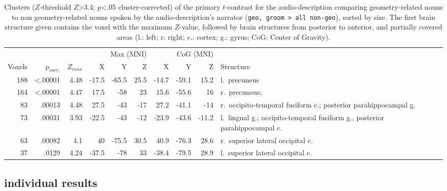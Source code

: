 \documentclass[english]{article}
\begin{document}
\begin{table*}[tbp]
\caption{Clusters ($Z$-threshold $Z$>3.4; $p$<.05 cluster-corrected)
    of the primary $t$-contrast for the audio-description comparing
    geometry-related nouns to non geometry-related nouns spoken by the
    audio-description's narrator (\texttt{geo, groom > all non-geo}), sorted by size.
    The first brain structure given contains the voxel with the maximum $Z$-value,
    followed by brain structures from posterior to anterior, and partially
    covered areas (l.: left; r: right; c.: cortex; g.: gyrus; CoG: Center of
    Gravity).}
    \label{tab:res-ao-group1}
\small
\begin{tabular}{rrrrrrrrrp{4.7cm}}
\toprule
& & & \multicolumn{3}{r}{Max (MNI)} & \multicolumn{3}{r}{CoG (MNI)} &
\\ \cmidrule{4-6} \cmidrule{7-9}
Voxels & $p_{corr.}$ & $Z_{max}$ & X & Y & Z  & X & Y & Z & Structure \\
\midrule
188 & <.00001 & 4.48 & -17.5 & -65.5 & 25.5 & -14.7 & -59.1 & 15.2 & l.~precuneus \\ %
164 & <.00001 & 4.47 & 17.5 & -58 & 23 & 15.6 & -55.6 & 16 & r.~precuneus;
\\ %
83 & .00013 & 4.48 & 27.5 & -43 & -17 & 27.2 & -41.1 & -14 & r.~occipito-temporal fusiform c.; posterior parahippocampal g. \\ %
73 & .00031 & 3.93 & -22.5 & -43 & -12 & -23.9 & -43.6 & -11.2 & l.~lingual
g.; occipito-temporal fusiform g., posterior parahippocampal c. \\ %
63 & .00082 & 4.1 & 40 & -75.5 & 30.5 & 40.9 & -76.3 & 28.6 & r.~superior
lateral occipital c. \\ %
37 & .0129 & 4.24 & -37.5 & -78 & 33 & -38.4 & -79.5 & 28.9 & l.~superior
lateral occipital c. \\ %
\bottomrule
\end{tabular}
\end{table*}


\subsection{individual results}
\end{document}
